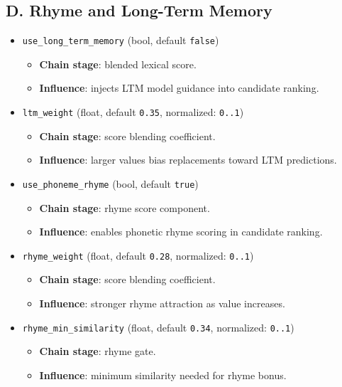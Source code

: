 \documentclass[11pt,a4paper]{article}
\begin{document}
\subsection*{D. Rhyme and Long-Term Memory}
\begin{itemize}
  \item \texttt{use\_long\_term\_memory} (bool, default \texttt{false})
  \begin{itemize}
    \item \textbf{Chain stage}: blended lexical score.
    \item \textbf{Influence}: injects LTM model guidance into candidate ranking.
  \end{itemize}

  \item \texttt{ltm\_weight} (float, default \texttt{0.35}, normalized: \texttt{0..1})
  \begin{itemize}
    \item \textbf{Chain stage}: score blending coefficient.
    \item \textbf{Influence}: larger values bias replacements toward LTM predictions.
  \end{itemize}

  \item \texttt{use\_phoneme\_rhyme} (bool, default \texttt{true})
  \begin{itemize}
    \item \textbf{Chain stage}: rhyme score component.
    \item \textbf{Influence}: enables phonetic rhyme scoring in candidate ranking.
  \end{itemize}

  \item \texttt{rhyme\_weight} (float, default \texttt{0.28}, normalized: \texttt{0..1})
  \begin{itemize}
    \item \textbf{Chain stage}: score blending coefficient.
    \item \textbf{Influence}: stronger rhyme attraction as value increases.
  \end{itemize}

  \item \texttt{rhyme\_min\_similarity} (float, default \texttt{0.34}, normalized: \texttt{0..1})
  \begin{itemize}
    \item \textbf{Chain stage}: rhyme gate.
    \item \textbf{Influence}: minimum similarity needed for rhyme bonus.
  \end{itemize}


\end{itemize}
\end{document}
